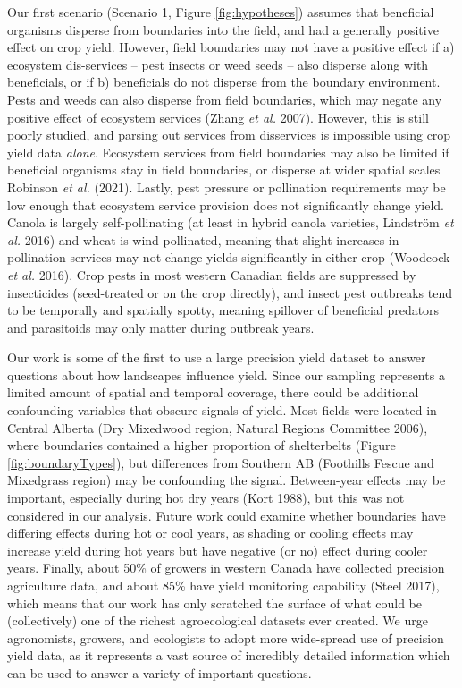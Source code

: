 \documentclass[]{elsarticle} %
\begin{document}
Our first scenario (Scenario 1, Figure \ref{fig:hypotheses}) assumes that beneficial organisms disperse from boundaries into the field, and had a generally positive effect on crop yield.
However, field boundaries may not have a positive effect if a) ecosystem dis-services -- pest insects or weed seeds -- also disperse along with beneficials, or if b) beneficials do not disperse from the boundary environment.
Pests and weeds can also disperse from field boundaries, which may negate any positive effect of ecosystem services (Zhang \emph{et al.} 2007).
However, this is still poorly studied, and parsing out services from disservices is impossible using crop yield data \emph{alone}.
Ecosystem services from field boundaries may also be limited if beneficial organisms stay in field boundaries, or disperse at wider spatial scales Robinson \emph{et al.} (2021).
Lastly, pest pressure or pollination requirements may be low enough that ecosystem service provision does not significantly change yield.
Canola is largely self-pollinating (at least in hybrid canola varieties, Lindström \emph{et al.} 2016) and wheat is wind-pollinated, meaning that slight increases in pollination services may not change yields significantly in either crop (Woodcock \emph{et al.} 2016).
Crop pests in most western Canadian fields are suppressed by insecticides (seed-treated or on the crop directly), and insect pest outbreaks tend to be temporally and spatially spotty, meaning spillover of beneficial predators and parasitoids may only matter during outbreak years.

Our work is some of the first to use a large precision yield dataset to answer questions about how landscapes influence yield.
Since our sampling represents a limited amount of spatial and temporal coverage, there could be additional confounding variables that obscure signals of yield.
Most fields were located in Central Alberta (Dry Mixedwood region, Natural Regions Committee 2006), where boundaries contained a higher proportion of shelterbelts (Figure \ref{fig:boundaryTypes}), but differences from Southern AB (Foothills Fescue and Mixedgrass region) may be confounding the signal.
Between-year effects may be important, especially during hot dry years (Kort 1988), but this was not considered in our analysis.
Future work could examine whether boundaries have differing effects during hot or cool years, as shading or cooling effects may increase yield during hot years but have negative (or no) effect during cooler years.
Finally, about 50\% of growers in western Canada have collected precision agriculture data, and about 85\% have yield monitoring capability (Steel 2017), which means that our work has only scratched the surface of what could be (collectively) one of the richest agroecological datasets ever created.
We urge agronomists, growers, and ecologists to adopt more wide-spread use of precision yield data, as it represents a vast source of incredibly detailed information which can be used to answer a variety of important questions.
\end{document}
